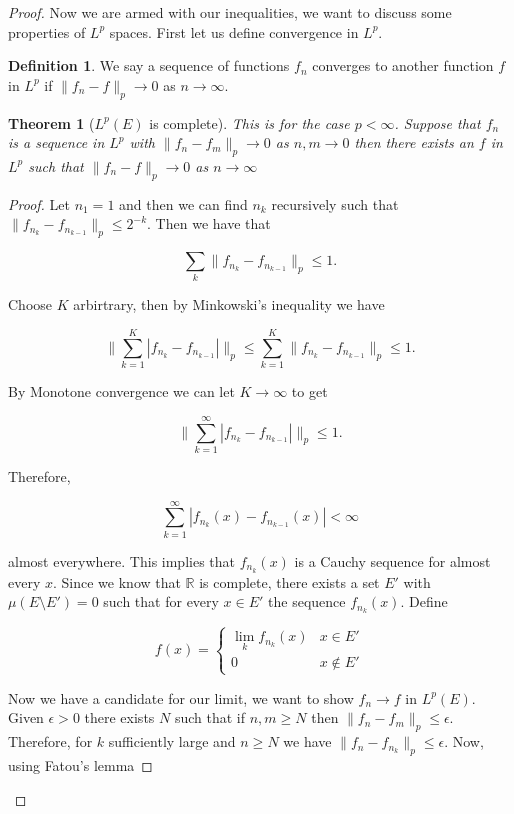 \documentclass[
]{book}
\newtheorem{theorem}{Theorem}[chapter]
\theoremstyle{definition}
\newtheorem{definition}{Definition}[chapter]
\theoremstyle{definition}
\theoremstyle{definition}
\theoremstyle{definition}
\theoremstyle{remark}
\begin{document}
\begin{proof}
Now we are armed with our inequalities, we want to discuss some properties of \(L^p\) spaces. First let us define convergence in \(L^p\).

\begin{definition}
We say a sequence of functions \(f_n\) converges to another function \(f\) in \(L^p\) if \(\|f_n -f\|_p \rightarrow 0\) as \(n \rightarrow \infty\).
\end{definition}

\begin{theorem}[$L^p(E)$ is complete]
This is for the case \(p<\infty\).
Suppose that \(f_n\) is a sequence in \(L^p\) with \(\|f_n - f_m\|_p \rightarrow 0\) as \(n,m \rightarrow 0\) then there exists an \(f\) in \(L^p\) such that \(\|f_n -f\|_p \rightarrow 0\) as \(n \rightarrow \infty\)
\end{theorem}

\begin{proof}
Let \(n_1 = 1\) and then we can find \(n_k\) recursively such that \(\|f_{n_k}-f_{n_{k-1}}\|_p \leq 2^{-k}\). Then we have that

\[ \sum_k \|f_{n_k}-f_{n_{k-1}}\|_p \leq 1. \]

Choose \(K\) arbirtrary, then by Minkowski's inequality we have

\[ \| \sum_{k=1}^K |f_{n_k}-f_{n_{k-1}}| \|_p \leq  \sum_{k=1}^K \|f_{n_k}- f_{n_{k-1}}\|_p \leq 1.\]

By Monotone convergence we can let \(K \rightarrow \infty\) to get

\[ \| \sum_{k=1}^\infty |f_{n_k} - f_{n_{k-1}}| \|_p \leq 1. \]

Therefore,

\[ \sum_{k=1}^\infty |f_{n_k}(x) -f_{n_{k-1}}(x)| < \infty \]

almost everywhere. This implies that \(f_{n_k}(x)\) is a Cauchy sequence for almost every \(x\). Since we know that \(\mathbb{R}\) is complete, there exists a set \(E'\) with \(\mu(E\setminus E')=0\) such that for every \(x \in E'\) the sequence \(f_{n_k}(x)\). Define

\[ f(x) = \left\{ \begin{array}{ll} \lim_k f_{n_k}(x) & x \in E' \\ 0 & x \notin E' \end{array}\right. \]

Now we have a candidate for our limit, we want to show \(f_n \rightarrow f\) in \(L^p(E)\). Given \(\epsilon >0\) there exists \(N\) such that if \(n, m \geq N\) then \(\|f_n -f_m\|_p \leq \epsilon\). Therefore, for \(k\) sufficiently large and \(n \geq N\) we have \(\|f_n - f_{n_k}\|_p \leq \epsilon\). Now, using Fatou's lemma


\end{proof}
\end{proof}
\end{document}
